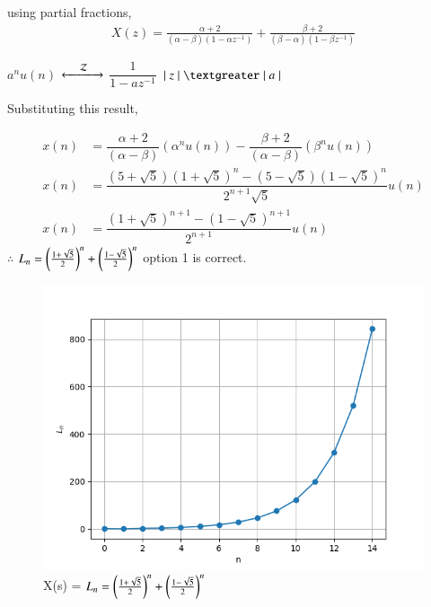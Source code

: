 \documentclass[journal,12pt,twocolumn]{IEEEtran}
\theoremstyle{remark}
\begin{document}
	\vspace{0.4cm}
 using partial fractions,
 \begin{align}
     X(z)=\frac{\alpha+2}{(\alpha-\beta)(1-\alpha z^{-1})}+\frac{\beta+2}{(\beta-\alpha)(1-\beta z^{-1})}
 \end{align}
 
	$a^n u(n)$
	$\xleftarrow[]{\hspace{0.4cm}{\mathcal{Z}}\hspace{0.1cm}}\xrightarrow[]{}$
	$\dfrac{1}{1 - a z^{-1}}$ \hspace{0.2cm} $\lvert \hspace{0.1cm} z \hspace{0.1cm}\rvert \hspace{0.1cm} \textgreater \hspace{0.1cm} \lvert \hspace{0.1cm} a \hspace{0.1cm} \rvert$
	
	\vspace{0.4cm}
	
	Substituting this result,
	
	\vspace{-0.5cm}
	
	\begin{align}
		x(n) &= \dfrac{\alpha+2}{(\alpha - \beta)} (\alpha^n u(n)) - \dfrac{\beta+2}{(\alpha - \beta)} (\beta^n u(n))\\
	    x(n) &= \dfrac{(5+\sqrt{5})(1 + \sqrt{5})^{n} - (5-\sqrt{5})(1 - \sqrt{5})^{n} }{2^{n+1} \sqrt{5}} u(n)\\
    	x(n) &= \dfrac{(1 + \sqrt{5})^{n+1} -(1 - \sqrt{5})^{n+1} }{2^{n+1}} u(n)
    \end{align}
$\therefore$ $L_{n} =\left(\frac{1+\sqrt{5}}{2}\right)^n+\left(\frac{1-\sqrt{5}}{2}\right)^n$
option 1 is correct.
\newpage
\begin{figure}[h]
  \centering
  \includegraphics[width=\columnwidth]{figs/fig1.png}
  \caption{X(s) = $L_{n}=\left(\frac{1+\sqrt{5}}{2}\right)^n+\left(\frac{1-\sqrt{5}}{2}\right)^n$}
  \label{fig:graph}
\end{figure}
\end{document}
